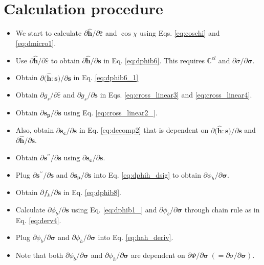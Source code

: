 \documentclass[12pt]{amsart}
\begin{document}
\newpage
\section{Calculation procedure}
\label{sec:prc}

\begin{itemize}
\item We start to calculate $\partial \hat{\mathbf{h}}/\partial \bar{\varepsilon}$ and $\cos\chi$ using Eqs. \ref{eq:coschi} and \ref{eq:dmicro1}.
\item Use $\partial \hat{\mathbf{h}}/\partial \bar{\varepsilon}$ to obtain $\partial \hat{\mathbf{h}}/\partial \mathbf{s}$ in Eq. \ref{eq:dphib6}. This requires $\mathbb{C}^{el}$ and $\partial\bar{\sigma}/\partial\mathbf{\sigma}$.
\item Obtain $\partial\big(\hat{\mathbf{h}}:\mathbf{s}\big)/\partial \mathbf{s}$ in Eq. \ref{eq:dphib6_1}
\item Obtain $\partial g_s/\partial\bar{\varepsilon}$ and $\partial g_s/\partial\mathbf{s}$ in Eqs. \ref{eq:cross_linear3} and \ref{eq:cross_linear4}.
\item Obtain $\partial \mathbf{s_p}/\partial\mathbf{s}$ using Eq. \ref{eq:cross_linear2_}.
\item Also, obtain $\partial \mathbf{s_c}/\partial \mathbf{s}$ in Eq. \ref{eq:decomp2} that is dependent on $\partial \big(\hat{\mathbf{h}}:\mathbf{s}\big)/\partial\mathbf{s}$ and $\partial \hat{\mathbf{h}}/\partial\mathbf{s}$.
\item Obtain $\partial\mathbf{s}^{\prime\prime}/\partial\mathbf{s}$ using $\partial \mathbf{s_c}/\partial \mathbf{s}$.
\item Plug $\partial\mathbf{s}^{\prime\prime}/\partial\mathbf{s}$ and  $\partial \mathbf{s_p}/\partial\mathbf{s}$ into Eq. \ref{eq:dphih_dsig} to obtain $\partial\phi_h/\partial\mathbf{\sigma}$.
\item Obtain $\partial f_k/\partial \mathbf{s}$ in Eq. \ref{eq:dphib8}.
\item Calculate $\partial \phi_b/\partial \mathbf{s}$ using Eq. \ref{eq:dphib1_} and $\partial \phi_b/\partial \mathbf{\sigma}$ through chain rule as in Eq. \ref{eq:derv4}.
\item Plug $\partial \phi_b/\partial\mathbf{\sigma}$ and $\partial\phi_h/\partial\mathbf{\sigma}$ into Eq. \ref{eq:hah_deriv}.
  \item Note that both $\partial \phi_b/\partial\mathbf{\sigma}$ and $\partial\phi_h/\partial\mathbf{\sigma}$ are dependent on $\partial\Phi/\partial\mathbf{\sigma}\ (=\partial\bar{\sigma}/\partial\mathbf{\sigma})$.
\end{itemize}





\newpage


\end{document}
